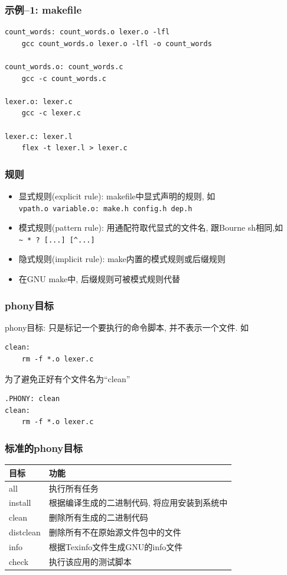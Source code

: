 \documentclass[compress]{beamer}
\begin{document}
\begin{frame}[containsverbatim]
\frametitle{示例--1: makefile}

\begin{Verbatim}[showtabs=true, label=makefile]
count_words: count_words.o lexer.o -lfl
	gcc count_words.o lexer.o -lfl -o count_words

count_words.o: count_words.c
	gcc -c count_words.c

lexer.o: lexer.c
	gcc -c lexer.c

lexer.c: lexer.l
	flex -t lexer.l > lexer.c
\end{Verbatim}

\end{frame}

\begin{frame}[containsverbatim]
\frametitle{规则}
\begin{itemize}
\item 显式规则(explicit rule): makefile中显式声明的规则, 如\\
\verb~vpath.o variable.o: make.h config.h dep.h~
\item 模式规则(pattern rule): 用通配符取代显式的文件名, 跟Bourne sh相同,如\\
\verb=~ * ? [...] [^...]=
\item 隐式规则(implicit rule): make内置的模式规则或后缀规则
\item 在GNU make中, 后缀规则可被模式规则代替
\end{itemize}

\end{frame}

\begin{frame}[containsverbatim]
\frametitle{phony目标}

phony目标: 只是标记一个要执行的命令脚本, 并不表示一个文件. 如\\
\begin{Verbatim}[showtabs=true]
clean:
	rm -f *.o lexer.c
\end{Verbatim}

为了避免正好有个文件名为``clean''
\begin{Verbatim}[showtabs=true]
.PHONY: clean
clean:
	rm -f *.o lexer.c
\end{Verbatim}

\end{frame}

\begin{frame}
\frametitle{标准的phony目标}
{\footnotesize
\begin{tabular}{|l|l|}\hline
目标 & 功能 \\ \hline \hline
all & 执行所有任务 \\ \hline
install & 根据编译生成的二进制代码, 将应用安装到系统中 \\ \hline
clean & 删除所有生成的二进制代码 \\ \hline
distclean & 删除所有不在原始源文件包中的文件 \\ \hline
info & 根据Texinfo文件生成GNU的info文件 \\ \hline
check & 执行该应用的测试脚本 \\ \hline
\end{tabular}
}

\end{frame}
\end{document}
